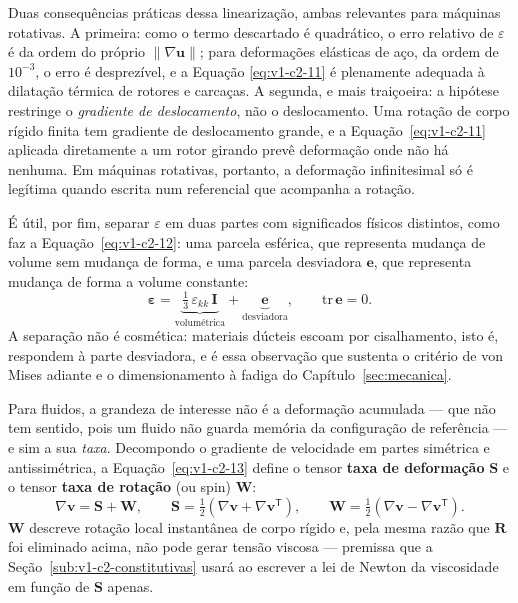 \documentclass[12pt,a4paper]{article}
\numberwithin{equation}{section}
\numberwithin{table}{section}
\numberwithin{figure}{section}
\begin{document}
Duas consequências práticas dessa linearização, ambas relevantes para máquinas
rotativas. A primeira: como o termo descartado é quadrático, o erro relativo de
$\varepsilon$ é da ordem do próprio $\|\nabla\mathbf{u}\|$; para deformações
elásticas de aço, da ordem de $10^{-3}$, o erro é desprezível, e a Equação
\eqref{eq:v1-c2-11} é plenamente adequada à dilatação térmica de rotores e
carcaças. A segunda, e mais traiçoeira: a hipótese restringe o \emph{gradiente
de deslocamento}, não o deslocamento. Uma rotação de corpo rígido finita tem
gradiente de deslocamento grande, e a Equação~\eqref{eq:v1-c2-11} aplicada
diretamente a um rotor girando prevê deformação onde não há nenhuma. Em
máquinas rotativas, portanto, a deformação infinitesimal só é legítima quando
escrita num referencial que acompanha a rotação.

É útil, por fim, separar $\varepsilon$ em duas partes com significados físicos
distintos, como faz a Equação~\eqref{eq:v1-c2-12}: uma parcela esférica, que
representa mudança de volume sem mudança de forma, e uma parcela desviadora
$\mathbf{e}$, que representa mudança de forma a volume constante:
\begin{equation}\label{eq:v1-c2-12}
\boldsymbol{\varepsilon} = \underbrace{\tfrac{1}{3}\,\varepsilon_{kk}\,\mathbf{I}}_{\text{volumétrica}}
+ \underbrace{\mathbf{e}}_{\text{desviadora}},
\qquad \mathrm{tr}\,\mathbf{e} = 0 .
\end{equation}
A separação não é cosmética: materiais dúcteis escoam por cisalhamento, isto é,
respondem à parte desviadora, e é essa observação que sustenta o critério de
von Mises adiante e o dimensionamento à fadiga do Capítulo~\ref{sec:mecanica}.

Para fluidos, a grandeza de interesse não é a deformação acumulada --- que não
tem sentido, pois um fluido não guarda memória da configuração de referência
--- e sim a sua \emph{taxa}. Decompondo o gradiente de velocidade em partes
simétrica e antissimétrica, a Equação~\eqref{eq:v1-c2-13} define o tensor
\textbf{taxa de deformação} $\mathbf{S}$ e o tensor \textbf{taxa de rotação}
(ou spin) $\mathbf{W}$:
\begin{equation}\label{eq:v1-c2-13}
\nabla\mathbf{v} = \mathbf{S} + \mathbf{W},
\qquad
\mathbf{S} = \tfrac{1}{2}\!\left(\nabla\mathbf{v} + \nabla\mathbf{v}^{\mathsf{T}}\right),
\qquad
\mathbf{W} = \tfrac{1}{2}\!\left(\nabla\mathbf{v} - \nabla\mathbf{v}^{\mathsf{T}}\right).
\end{equation}
$\mathbf{W}$ descreve rotação local instantânea de corpo rígido e, pela mesma
razão que $\mathbf{R}$ foi eliminado acima, não pode gerar tensão viscosa ---
premissa que a Seção~\ref{sub:v1-c2-constitutivas} usará ao escrever a lei de
Newton da viscosidade em função de $\mathbf{S}$ apenas.
\end{document}
